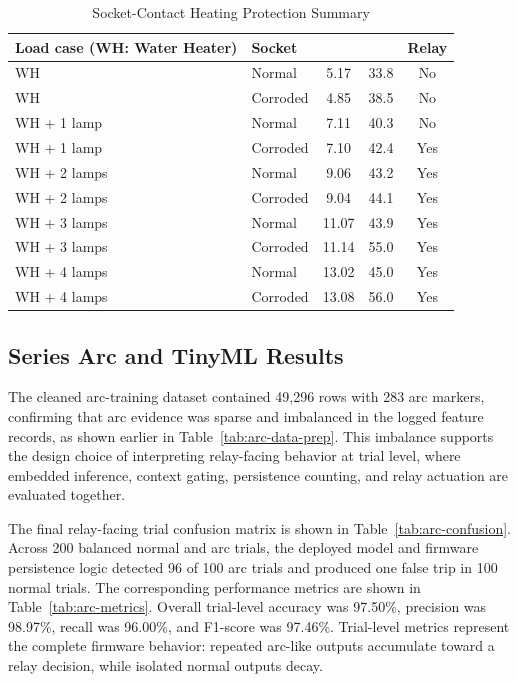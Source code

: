 \documentclass[conference,a4paper]{template/IEEEtran}
\begin{document}
\begin{table}[!htbp]
\caption{Socket-Contact Heating Protection Summary}
\label{tab:heating}
\centering
\footnotesize
\setlength{\tabcolsep}{3pt}
\begin{tabularx}{\columnwidth}{@{}Ylccc@{}}
\toprule
\textbf{Load case (WH: Water Heater)} & \textbf{Socket} & \textbf{} & \textbf{} & \textbf{Relay}\\
\midrule
WH & Normal & 5.17 & 33.8 & No\\
WH & Corroded & 4.85 & 38.5 & No\\
WH + 1 lamp & Normal & 7.11 & 40.3 & No\\
WH + 1 lamp & Corroded & 7.10 & 42.4 & Yes\\
WH + 2 lamps & Normal & 9.06 & 43.2 & Yes\\
WH + 2 lamps & Corroded & 9.04 & 44.1 & Yes\\
WH + 3 lamps & Normal & 11.07 & 43.9 & Yes\\
WH + 3 lamps & Corroded & 11.14 & 55.0 & Yes\\
WH + 4 lamps & Normal & 13.02 & 45.0 & Yes\\
WH + 4 lamps & Corroded & 13.08 & 56.0 & Yes\\
\bottomrule
\end{tabularx}
\end{table}

\subsection{Series Arc and TinyML Results}

The cleaned arc-training dataset contained 49,296 rows with 283 arc
markers, confirming that arc evidence was sparse and imbalanced in the
logged feature records, as shown earlier in Table~\ref{tab:arc-data-prep}.
This imbalance supports the design choice of
interpreting relay-facing behavior at trial level, where embedded
inference, context gating, persistence counting, and relay actuation are
evaluated together.

The final relay-facing trial confusion matrix is shown in
Table~\ref{tab:arc-confusion}. Across 200 balanced normal and arc
trials, the deployed model and firmware persistence logic detected 96 of
100 arc trials and produced one false trip in 100 normal trials. The
corresponding performance metrics are shown in Table~\ref{tab:arc-metrics}.
Overall trial-level accuracy was 97.50\%, precision was 98.97\%, recall
was 96.00\%, and F1-score was 97.46\%. Trial-level metrics represent the
complete firmware behavior: repeated arc-like outputs accumulate toward a
relay decision, while isolated normal outputs decay.
\end{document}
